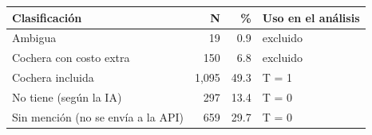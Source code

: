\begin{tabular}{lrrl}
\toprule
Clasificación & N & \% & Uso en el análisis \\
\midrule
Ambigua & 19 & 0.9 & excluido \\
Cochera con costo extra & 150 & 6.8 & excluido \\
Cochera incluida & 1,095 & 49.3 & T = 1 \\
No tiene (según la IA) & 297 & 13.4 & T = 0 \\
Sin mención (no se envía a la API) & 659 & 29.7 & T = 0 \\
\bottomrule
\end{tabular}